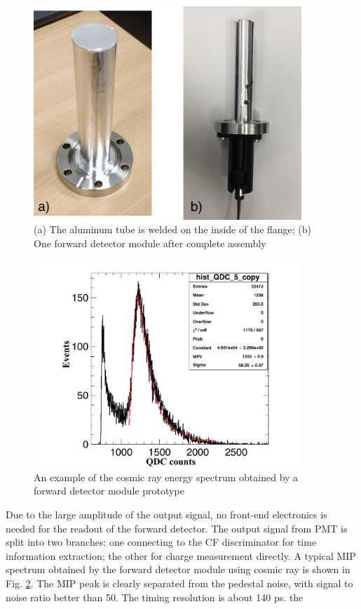 \documentclass[number]{elsarticle}
\begin{document}
\begin{figure}[htbp]
\centering
\includegraphics[width=0.9\textwidth]{./forward_module.png}
\caption{(a) The aluminum tube is welded on the inside of the flange; (b) One forward detector module after complete assembly}
\label{fig:forward_module}
\end{figure}

\begin{figure}[htbp]
\centering
\includegraphics[width=0.9\textwidth]{./forward_mip.pdf}
\caption{An example of the cosmic ray energy spectrum obtained by a forward detector module prototype}
\label{fig:forward_mip}
\end{figure}

Due to the large amplitude of the output signal, no front-end electronics is needed for the readout of the forward detector.
The output signal from PMT is split into two branches: one connecting to the CF discriminator for time information extraction; the other for charge measurement directly.
A typical MIP spectrum obtained by the forward detector module using cosmic ray is shown in Fig. \ref{fig:forward_mip}. 
The MIP peak is clearly separated from the pedestal noise, with signal to noise ratio better than 50.
The timing resolution is about 140 ps.
the
\end{document}
